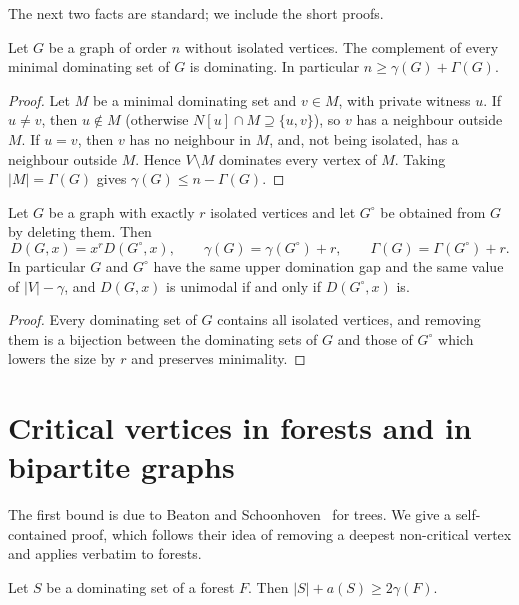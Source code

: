 \documentclass[smallextended,envcountsect,envcountsame]{svjour3}
\begin{document}
The next two facts are standard; we include the short proofs.

\begin{lemma}\label{lem:ore}
Let $G$ be a graph of order $n$ without isolated vertices. The complement of
every minimal dominating set of $G$ is dominating. In particular
$n\ge\gamma(G)+\Gamma(G)$.
\end{lemma}

\begin{proof}
Let $M$ be a minimal dominating set and $v\in M$, with private witness $u$.
If $u\ne v$, then $u\notin M$ (otherwise $N[u]\cap M\supseteq\{u,v\}$), so
$v$ has a neighbour outside $M$. If $u=v$, then $v$ has no neighbour in $M$,
and, not being isolated, has a neighbour outside $M$. Hence $V\setminus M$
dominates every vertex of $M$. Taking $|M|=\Gamma(G)$ gives
$\gamma(G)\le n-\Gamma(G)$.
\end{proof}

\begin{lemma}\label{lem:isolates}
Let $G$ be a graph with exactly $r$ isolated vertices and let $G^{\circ}$ be
obtained from $G$ by deleting them. Then
\begingroup\small\[
  D(G,x)=x^{r}D(G^{\circ},x),\qquad \gamma(G)=\gamma(G^{\circ})+r,\qquad
  \Gamma(G)=\Gamma(G^{\circ})+r .
\]\endgroup
In particular $G$ and $G^{\circ}$ have the same upper domination gap and the
same value of $|V|-\gamma$, and $D(G,x)$ is unimodal if and only if
$D(G^{\circ},x)$ is.
\end{lemma}

\begin{proof}
Every dominating set of $G$ contains all isolated vertices, and removing them
is a bijection between the dominating sets of $G$ and those of $G^{\circ}$
which lowers the size by $r$ and preserves minimality.
\end{proof}

\section{Critical vertices in forests and in bipartite graphs}\label{sec:critical}

The first bound is due to Beaton and Schoonhoven~\cite[Lemma~5]{BS} for
trees. We give a self-contained proof, which follows their idea of removing
a deepest non-critical vertex and applies verbatim to forests.

\begin{lemma}\label{lem:lower}
Let $S$ be a dominating set of a forest $F$. Then
$|S|+a(S)\ge 2\gamma(F)$.
\end{lemma}
\end{document}
